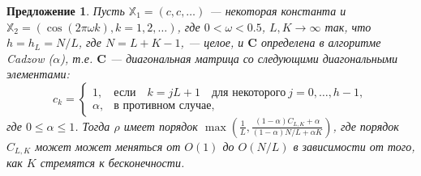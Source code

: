 \documentclass[12pt,a4paper,fleqn,leqno]{article}
\newtheorem{proposition}{Предложение}
\newcommand{\tsX}{\mathbb{X}}
\newcommand{\bfC}{\mathbf{C}}
\newcommand{\ra}{\rightarrow}
\begin{document}
\begin{proposition}
\label{prop:separ1}
Пусть $\tsX_1 = (c, c, \ldots)$ --- некоторая константа и $\tsX_2 = (\cos(2 \pi \omega k), k = 1, 2, \ldots)$, где $0<\omega <0.5$, $L,K\ra \infty$ так, что $h = h_L = N/L$, где $N=L+K-1$, --- целое, и $\bfC$ определена в алгоритме Cadzow ($\alpha$), т.е.  $\bfC$ --- диагональная матрица со следующими диагональными элементами:
\begin{equation*}
c_k = \begin{cases}
1, & \text{если} \quad k = jL+1 \quad \text{для некоторого} \ j = 0, \ldots, h-1,\\
\alpha, & \text{в противном случае},
\end{cases}
\end{equation*}
где $0 \le \alpha \le 1$. Тогда $\rho$ имеет порядок $\max(\frac{1}{L}, \frac{(1-\alpha)C_{L,K}+\alpha}{(1-\alpha)N/L+\alpha K})$, где порядок $C_{L,K}$
может может меняться от $O(1)$ до $O(N/L)$ в зависимости от того, как $K$ стремятся к бесконечности.
\end{proposition}
\end{document}
